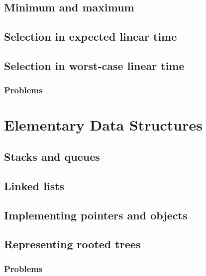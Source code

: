 \documentclass[fontsize=12pt,paper=a4,open=any]{book}
\begin{document}
\section{Minimum and maximum}

\section{Selection in expected linear time}

\section{Selection in worst-case linear time}

\subsection*{Problems}


\chapter{Elementary Data Structures}

\section{Stacks and queues}

\section{Linked lists}

\section{Implementing pointers and objects}

\section{Representing rooted trees}

\subsection*{Problems}
\end{document}
